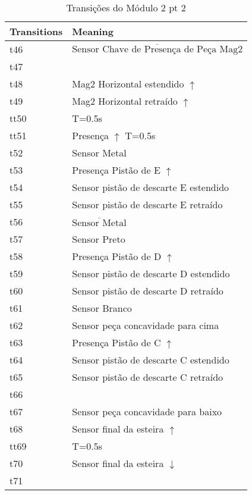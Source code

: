 \begin{table}[htbp]
\caption{Transições do Módulo 2 pt 2}
\centering
\begin{tabular}{ll}
Transitions & Meaning\\
\hline
t46 & \(\overline{\mbox{Sensor Chave de Presença de Peça Mag2}}\)\\
t47 & \\
t48 & Mag2 Horizontal estendido \(\uparrow\)\\
t49 & Mag2 Horizontal retraído \(\uparrow\)\\
tt50 & T=0.5s\\
tt51 & Presença \(\uparrow\) T=0.5s\\
t52 & Sensor Metal\\
t53 & Presença Pistão de E \(\uparrow\)\\
t54 & Sensor pistão de descarte E estendido\\
t55 & Sensor pistão de descarte E retraído\\
t56 & \(\overline{\mbox{Sensor Metal}}\)\\
t57 & Sensor Preto\\
t58 & Presença Pistão de D \(\uparrow\)\\
t59 & Sensor pistão de descarte D estendido\\
t60 & Sensor pistão de descarte D retraído\\
t61 & Sensor Branco\\
t62 & Sensor peça concavidade para cima\\
t63 & Presença Pistão de C \(\uparrow\)\\
t64 & Sensor pistão de descarte C estendido\\
t65 & Sensor pistão de descarte C retraído\\
t66 & \\
t67 & Sensor peça concavidade para baixo\\
t68 & Sensor final da esteira \(\uparrow\)\\
tt69 & T=0.5s\\
t70 & Sensor final da esteira \(\downarrow\)\\
t71 & \\
\end{tabular}
\end{table}
